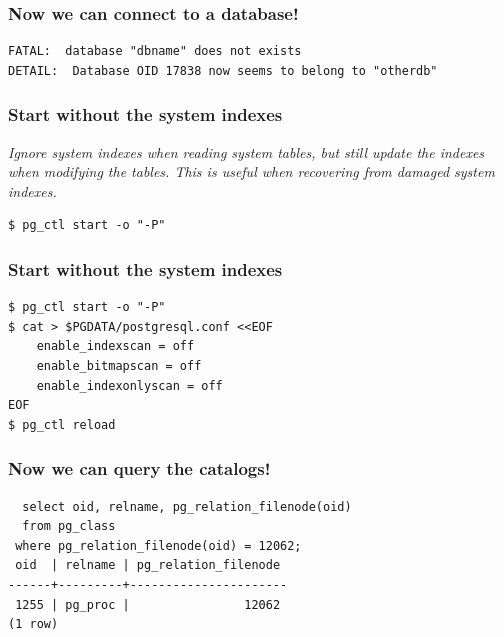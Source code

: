 \documentclass{beamer}
\begin{document}
\begin{frame}[fragile]
  \frametitle{Now we can connect to a database!}
  
  \vfill

  \begin{verbatim}
FATAL:  database "dbname" does not exists
DETAIL:  Database OID 17838 now seems to belong to "otherdb"
  \end{verbatim}  
\end{frame}

\begin{frame}[fragile]
  \frametitle{Start without the system indexes}
  
  \textit{Ignore system indexes when reading system tables, but still update
    the indexes when modifying the tables. This is useful when recovering
    from damaged system indexes.}
  \vfill

  \begin{verbatim}
$ pg_ctl start -o "-P"
  \end{verbatim}  
\end{frame}

\begin{frame}[fragile]
  \frametitle{Start without the system indexes}
  
  \vfill

  \begin{verbatim}
$ pg_ctl start -o "-P"
$ cat > $PGDATA/postgresql.conf <<EOF
	enable_indexscan = off
	enable_bitmapscan = off
	enable_indexonlyscan = off
EOF
$ pg_ctl reload
  \end{verbatim}  
\end{frame}

\begin{frame}[fragile]
  \frametitle{Now we can query the catalogs!}
  
  \vfill

  \begin{verbatim}
  select oid, relname, pg_relation_filenode(oid)
  from pg_class
 where pg_relation_filenode(oid) = 12062;
 oid  | relname | pg_relation_filenode 
------+---------+----------------------
 1255 | pg_proc |                12062
(1 row)
  \end{verbatim}
\end{frame}
\end{document}
